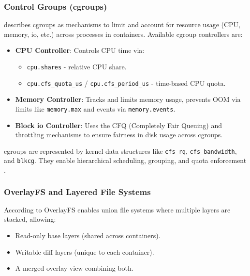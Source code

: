 
\subsubsection{Control Groups (cgroups)}
\citet{jainLinuxContainersVirtualization2023} describes cgroups as mechanisms to limit and account for resource usage (CPU, memory, \ac{io}, etc.) across processes in containers.
Available cgroup controllers are:
\begin{itemize}
    \item \textbf{CPU Controller}: Controls CPU time via:
    \begin{itemize}
        \item \texttt{cpu.shares} - relative CPU share.
        \item \texttt{cpu.cfs\_quota\_us} / \texttt{cpu.cfs\_period\_us} - time-based CPU quota.
    \end{itemize}
    \item \textbf{Memory Controller}: Tracks and limits memory usage, prevents OOM via limits like \texttt{memory.max} and events via \texttt{memory.events}.
    \item \textbf{Block \ac{io} Controller}: Uses the CFQ (Completely Fair Queuing) and throttling mechanisms to ensure fairness in disk usage across cgroups.
\end{itemize}
cgroups are represented by kernel data structures like \texttt{cfs\_rq}, \texttt{cfs\_bandwidth}, and \texttt{blkcg}.
They enable hierarchical scheduling, grouping, and quota enforcement \citep{jainLinuxContainersVirtualization2023}.

\subsubsection{OverlayFS and Layered File Systems}
\label{sec:overlayfs}
According to \citet{jainLinuxContainersVirtualization2023} OverlayFS enables union file systems where multiple layers are stacked, allowing:
\begin{itemize}
    \item Read-only base layers (shared across containers).
    \item Writable diff layers (unique to each container).
    \item A merged overlay view combining both.
\end{itemize}

